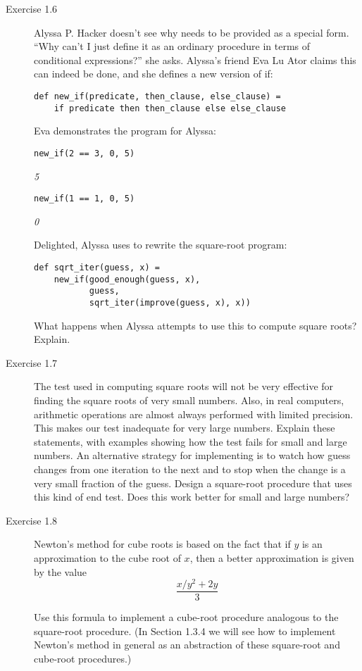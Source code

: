 \begin{description}
\item[Exercise 1.6] Alyssa P. Hacker doesn't see why  needs to be provided as a special form. ``Why can't I just define it as an ordinary procedure in terms of conditional expressions?'' she asks. Alyssa's friend Eva Lu Ator claims this can indeed be done, and she defines a new version of if:

\begin{lstlisting}
def new_if(predicate, then_clause, else_clause) =
    if predicate then then_clause else else_clause
\end{lstlisting}

Eva demonstrates the program for Alyssa:

\begin{lstlisting}
new_if(2 == 3, 0, 5)
\end{lstlisting}
\textit{5}

\begin{lstlisting}
new_if(1 == 1, 0, 5)
\end{lstlisting}
\textit{0}

Delighted, Alyssa uses  to rewrite the square-root program:

\begin{lstlisting}
def sqrt_iter(guess, x) =
    new_if(good_enough(guess, x),
           guess,
           sqrt_iter(improve(guess, x), x))
\end{lstlisting}

What happens when Alyssa attempts to use this to compute square roots? Explain.

\item[Exercise 1.7] The  test used in computing square roots will not be very effective for finding the square roots of very small numbers. Also, in real computers, arithmetic operations are almost always performed with limited precision. This makes our test inadequate for very large numbers. Explain these statements, with examples showing how the test fails for small and large numbers. An alternative strategy for implementing  is to watch how guess changes from one iteration to the next and to stop when the change is a very small fraction of the guess. Design a square-root procedure that uses this kind of end test. Does this work better for small and large numbers?

\item[Exercise 1.8] Newton's method for cube roots is based on the fact that if $y$ is an approximation to the cube root of $x$, then a better approximation is given by the value
\begin{equation}
\frac{x/y^2 + 2y}{3}
\end{equation}

Use this formula to implement a cube-root procedure analogous to the square-root procedure. (In Section 1.3.4 we will see how to implement Newton's method in general as an abstraction of these square-root and cube-root procedures.)
\end{description}

